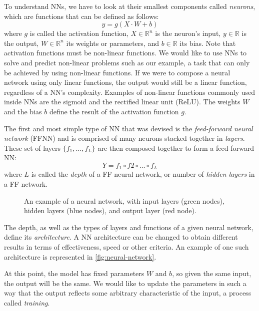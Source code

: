 To understand NNs, we have to look at their smallest components called \textit{neurons}, which are functions that can be defined as follows:
\begin{equation}
    y = g(X \cdot W + b)
\end{equation}
where $g$ is called the activation function, $X \in \mathbb{R}^n$ is the neuron's input, $y \in \mathbb{R}$ is the output, $W \in \mathbb{R}^n$ its weights or parameters, and $b \in \mathbb{R}$ its bias.
Note that activation functions must be non-linear functions.
We would like to use NNs to solve and predict non-linear problems such as our example, a task that can only be achieved by using non-linear functions.
If we were to compose a neural network using only linear functions, the output would still be a linear function, regardless of a NN's complexity.
Examples of non-linear functions commonly used inside NNs are the sigmoid and the rectified linear unit (ReLU).
The weights $W$ and the bias $b$ define the result of the activation function $g$.

The first and most simple type of NN that was devised is the \textit{feed-forward neural network} (FFNN) and is comprised of many neurons stacked together in \textit{layers}.
These set of layers $\{f_1, \dots, f_L\}$ are then composed together to form a feed-forward NN:
\begin{equation}
    Y = f_1 \circ f2 \circ \ldots \circ f_L
\end{equation}
where $L$ is called the \textit{depth} of a FF neural network, or number of \textit{hidden layers} in a FF network.

\begin{figure}[ht]
    \centering
    \caption{An example of a neural network, with input layers (green nodes), hidden layers (blue nodes), and output layer (red node).}
    \label{fig:neural-network}
    
\end{figure}

The depth, as well as the types of layers and functions of a given neural network, define its \textit{architecture}.
A NN architecture can be changed to obtain different results in terms of effectiveness, speed or other criteria.
An example of one such architecture is represented in \autoref{fig:neural-network}.

At this point, the model has fixed parameters $W$ and $b$, so given the same input, the output will be the same.
We would like to update the parameters in such a way that the output reflects some arbitrary characteristic of the input, a process called \textit{training}.

